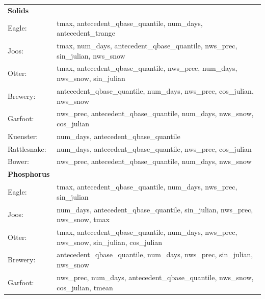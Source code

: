 \documentclass[10pt]{article}
\begin{document}
\begin{table}[h!]\small
    \begin{center}
    \begin{tabular}{ll}
        \textbf{Solids} & \\
        \hspace{5mm} Eagle: & tmax, antecedent\_qbase\_quantile, num\_days, antecedent\_trange\\
        \hspace{5mm} Joos: & tmax, num\_days, antecedent\_qbase\_quantile, nws\_prec, sin\_julian, nws\_snow\\
        \hspace{5mm} Otter: & tmax, antecedent\_qbase\_quantile, nws\_prec, num\_days, nws\_snow, sin\_julian\\
        \hspace{5mm} Brewery: & antecedent\_qbase\_quantile, num\_days, nws\_prec, cos\_julian, nws\_snow\\
        \hspace{5mm} Garfoot: & nws\_prec, antecedent\_qbase\_quantile, num\_days, nws\_snow, cos\_julian\\
        \hspace{5mm} Kuenster: & num\_days, antecedent\_qbase\_quantile\\
        \hspace{5mm} Rattlesnake: & num\_days, antecedent\_qbase\_quantile, nws\_prec, cos\_julian \\
        \hspace{5mm} Bower: & nws\_prec, antecedent\_qbase\_quantile, num\_days, nws\_snow
    \vspace{2mm}\\
        \textbf{Phosphorus} & \\
        \hspace{5mm} Eagle: & tmax, antecedent\_qbase\_quantile, num\_days, nws\_prec, sin\_julian\\
        \hspace{5mm} Joos: & num\_days, antecedent\_qbase\_quantile, sin\_julian, nws\_prec, nws\_snow, tmax\\
        \hspace{5mm} Otter: & tmax, antecedent\_qbase\_quantile, num\_days, nws\_prec, nws\_snow, sin\_julian, cos\_julian\\
        \hspace{5mm} Brewery: & antecedent\_qbase\_quantile, num\_days, nws\_prec, sin\_julian, nws\_snow\\
        \hspace{5mm} Garfoot: & nws\_prec, num\_days, antecedent\_qbase\_quantile, nws\_snow, cos\_julian, tmean\\

\end{tabular}
\end{center}
\end{table}
\end{document}
